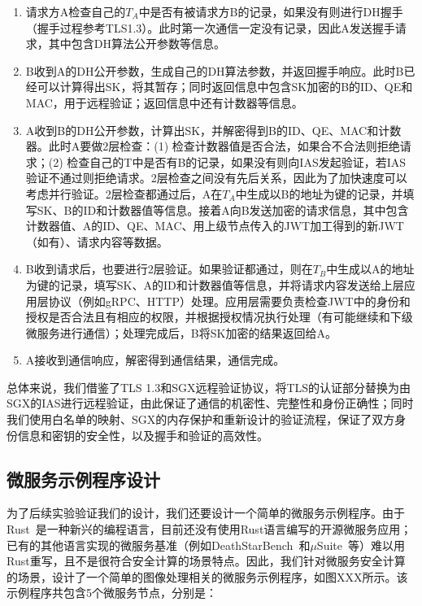 \begin{enumerate}
    \item 请求方A检查自己的$T_A$中是否有被请求方B的记录，如果没有则进行DH握手（握手过程参考TLS1.3）。此时第一次通信一定没有记录，因此A发送握手请求，其中包含DH算法公开参数等信息。
    \item B收到A的DH公开参数，生成自己的DH算法参数，并返回握手响应。此时B已经可以计算得出SK，将其暂存；同时返回信息中包含SK加密的B的ID、QE和MAC，用于远程验证；返回信息中还有计数器等信息。
    \item A收到B的DH公开参数，计算出SK，并解密得到B的ID、QE、MAC和计数器。此时A要做2层检查：(1) 检查计数器值是否合法，如果合不合法则拒绝请求；(2) 检查自己的T中是否有B的记录，如果没有则向IAS发起验证，若IAS验证不通过则拒绝请求。2层检查之间没有先后关系，因此为了加快速度可以考虑并行验证。2层检查都通过后，A在$T_A$中生成以B的地址为键的记录，并填写SK、B的ID和计数器值等信息。接着A向B发送加密的请求信息，其中包含计数器值、A的ID、QE、MAC、用上级节点传入的JWT加工得到的新JWT（如有）、请求内容等数据。
    \item B收到请求后，也要进行2层验证。如果验证都通过，则在$T_B$中生成以A的地址为键的记录，填写SK、A的ID和计数器值等信息，并将请求内容发送给上层应用层协议（例如gRPC、HTTP）处理。应用层需要负责检查JWT中的身份和授权是否合法且有相应的权限，并根据授权情况执行处理（有可能继续和下级微服务进行通信）；处理完成后，B将SK加密的结果返回给A。
    \item A接收到通信响应，解密得到通信结果，通信完成。
\end{enumerate}

总体来说，我们借鉴了TLS 1.3和SGX远程验证协议，将TLS的认证部分替换为由SGX的IAS进行远程验证，由此保证了通信的机密性、完整性和身份正确性；同时我们使用白名单的映射、SGX的内存保护和重新设计的验证流程，保证了双方身份信息和密钥的安全性，以及握手和验证的高效性。

\subsection{微服务示例程序设计}\label{subsec:ms-example}

为了后续实验验证我们的设计，我们还要设计一个简单的微服务示例程序。由于Rust~\cite{rust-lang}是一种新兴的编程语言，目前还没有使用Rust语言编写的开源微服务应用；已有的其他语言实现的微服务基准（例如DeathStarBench~\cite{gan2019open}和$\mu$Suite~\cite{sriraman2018mu}等）难以用Rust重写，且不是很符合安全计算的场景特点。因此，我们针对微服务安全计算的场景，设计了一个简单的图像处理相关的微服务示例程序，如图XXX所示。该示例程序共包含5个微服务节点，分别是：%

